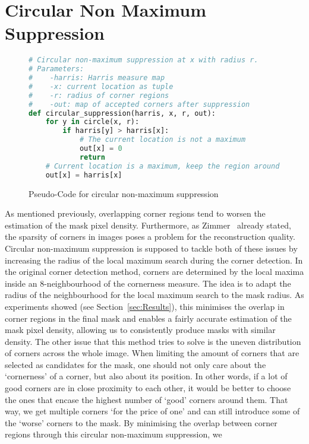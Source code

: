 \section{Circular Non Maximum Suppression}\label{sec:Suppression}
\begin{figure}[t]
    \begin{lstlisting}[language=Python]
# Circular non-maximum suppression at x with radius r.
# Parameters:
#    -harris: Harris measure map
#    -x: current location as tuple
#    -r: radius of corner regions
#    -out: map of accepted corners after suppression
def circular_suppression(harris, x, r, out):
    for y in circle(x, r):
        if harris[y] > harris[x]:
            # The current location is not a maximum
            out[x] = 0
            return
    # Current location is a maximum, keep the region around it
    out[x] = harris[x]
    \end{lstlisting}
    \caption{Pseudo-Code for circular non-maximum suppression}
\end{figure}
\noindent As mentioned previously, overlapping corner regions tend to worsen the estimation of the mask pixel
density. 
Furthermore, as Zimmer~\cite{zimmer07} already stated, the sparsity of corners in images poses a
problem for the reconstruction quality. Circular non-maximum suppression is supposed to tackle both of these 
issues by increasing the radius of the local maximum search during the corner detection. 
In the original corner detection method, corners are determined by the local maxima inside an 
8-neighbourhood of the cornerness measure. The idea is to adapt the radius of the neighbourhood for the
local maximum search to the mask radius.\newpage\noindent
As experiments showed (see Section~\ref{sec:Results}), this minimises the overlap in
corner regions in the final mask and enables a fairly accurate estimation of the mask pixel
density, allowing us to consistently produce masks with similar density.
The other issue that this method tries to solve is the uneven distribution of corners across
the whole image. When limiting the amount of corners that are selected as candidates for the mask, one should not only care about
the `cornerness' of a corner, but also about its position. 
In other words, if a lot of good corners
are in close proximity to each other, it would be better to choose the ones that encase the 
highest number of `good' corners around them. 
That way, we get multiple corners `for the price of one' and can still introduce some 
of the `worse' corners to the mask.
By minimising the overlap between corner regions through this circular non-maximum suppression, we
